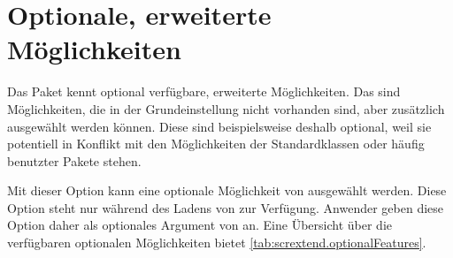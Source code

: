 


\section{Optionale, erweiterte Möglichkeiten}

Das Paket  kennt optional verfügbare, erweiterte
Möglichkeiten. Das sind Möglichkeiten, die in der Grundeinstellung nicht
vorhanden sind, aber zusätzlich ausgewählt werden können. Diese
sind beispielsweise deshalb optional, weil sie potentiell in Konflikt mit den
Möglichkeiten der Standardklassen oder häufig benutzter Pakete stehen.

\begin{Declaration}
\end{Declaration}
Mit dieser Option kann eine optionale Möglichkeit von 
ausgewählt werden. Diese Option steht nur während des Ladens von
 zur Verfügung. Anwender geben diese Option daher als
optionales Argument von
 an. %
Eine Übersicht über die verfügbaren optionalen Möglichkeiten bietet
\autoref{tab:scrextend.optionalFeatures}.%
%
\begin{table}
  \caption[{Optional verfügbare, erweiterte Möglichkeiten
    von }]{Übersicht über die optional verfügbaren,
    erweiterten Möglichkeiten von }
  \label{tab:scrextend.optionalFeatures}
  \begin{desctabular}
  \end{desctabular}
\end{table}%
%
\EndIndexGroup


